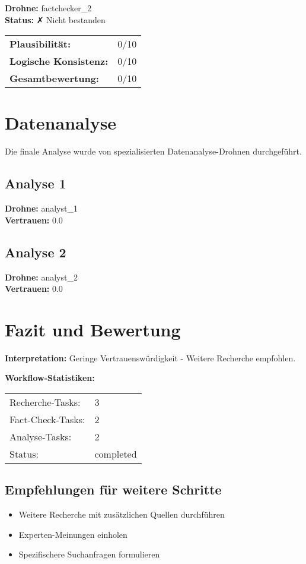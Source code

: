 \documentclass[12pt,a4paper]{article}
\begin{document}
\textbf{Drohne:} factchecker\_2\\
\textbf{Status:} ✗ Nicht bestanden\\

\begin{tabular}{ll}
\textbf{Plausibilität:} & 0/10 \\
\textbf{Logische Konsistenz:} & 0/10 \\
\textbf{Gesamtbewertung:} & 0/10 \\
\end{tabular}



\newpage
\section{Datenanalyse}

Die finale Analyse wurde von spezialisierten Datenanalyse-Drohnen durchgeführt.

\subsection{Analyse 1}

\textbf{Drohne:} analyst\_1\\
\textbf{Vertrauen:} 0.0%

\subsection{Analyse 2}

\textbf{Drohne:} analyst\_2\\
\textbf{Vertrauen:} 0.0%


\newpage
\section{Fazit und Bewertung}


\textbf{Interpretation:} Geringe Vertrauenswürdigkeit - Weitere Recherche empfohlen.

\textbf{Workflow-Statistiken:}
\begin{tabular}{ll}
Recherche-Tasks: & 3 \\
Fact-Check-Tasks: & 2 \\
Analyse-Tasks: & 2 \\
Status: & completed \\
\end{tabular}

\subsection{Empfehlungen für weitere Schritte}

\begin{itemize}
\item Weitere Recherche mit zusätzlichen Quellen durchführen
\item Experten-Meinungen einholen
\item Spezifischere Suchanfragen formulieren
\end{itemize}
\end{document}
